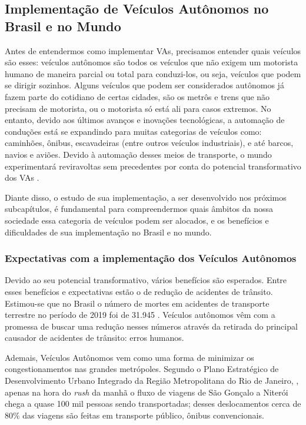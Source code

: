 \subsection{Implementação de Veículos Autônomos no Brasil e no Mundo}
Antes de entendermos como implementar VAs, precisamos entender quais veículos são esses: veículos autônomos são todos os veículos que não exigem um motorista humano de maneira parcial ou total para conduzi-los, ou seja, veículos que podem se dirigir sozinhos. Alguns veículos que podem ser considerados autônomos já fazem parte do cotidiano de certas cidades, são os metrôs e trens que não precisam de motorista, ou o motorista só está ali para casos extremos. No entanto, devido aos últimos avanços e inovações tecnológicas, a automação de conduções está se expandindo para muitas categorias de veículos como: caminhões, ônibus, escavadeiras (entre outros veículos industriais), e até barcos, navios e aviões. Devido à automação desses meios de transporte, o mundo experimentará reviravoltas sem precedentes por conta do potencial transformativo dos VAs \cite{4cenarios_ocidental}.

Diante disso, o estudo de sua implementação, a ser desenvolvido nos próximos subcapítulos, é fundamental para compreendermos quais âmbitos da nossa sociedade essa categoria de veículos podem ser alocados, e os benefícios e dificuldades de sua implementação no Brasil e no mundo.

\subsubsection{Expectativas com a implementação dos Veículos Autônomos}
Devido ao seu potencial transformativo, vários benefícios são esperados. Entre esses benefícios e expectativas estão o de redução de acidentes de trânsito. Estimou-se que no Brasil o número de mortes em acidentes de transporte terrestre no período de 2019 foi de 31.945 \cite{Anexo_I_pnatrans}. Veículos autônomos vêm com a promessa de buscar uma redução nesses números através da retirada do principal causador de acidentes de trânsito: erros humanos. 

Ademais, Veículos Autônomos vem como uma forma de minimizar os congestionamentos nas grandes metrópoles. Segundo o Plano Estratégico de Desenvolvimento Urbano Integrado da Região Metropolitana do Rio de Janeiro, \cite{rj_transito}, apenas na hora do \textit{rush} da manhã o fluxo de viagens de São Gonçalo a Niterói chega a quase 100 mil pessoas sendo transportadas; desses deslocamentos cerca de 80\% das viagens são feitas em transporte público, ônibus convencionais. 

